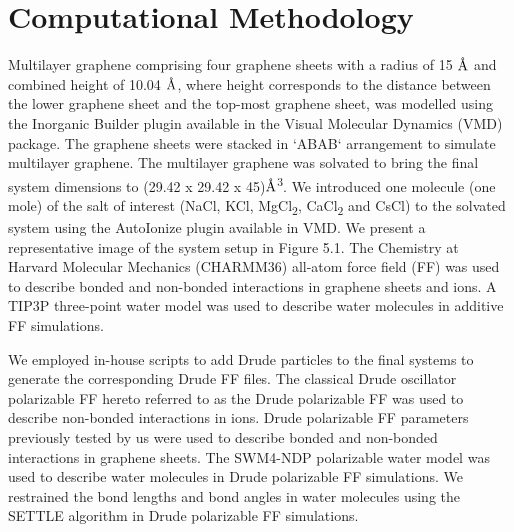 \section{Computational Methodology}
Multilayer graphene comprising four graphene sheets with a radius of 15 $\text{\normalfont\AA}$ and combined height of 10.04 $\text{\normalfont\AA}$, where height corresponds to the distance between the lower graphene sheet and the top-most graphene sheet, was modelled using the Inorganic Builder plugin available in the Visual Molecular Dynamics (VMD) package.\supercite{humphrey_vmd_1996} The graphene sheets were stacked in `ABAB` arrangement to simulate multilayer graphene. The multilayer graphene was solvated to bring the final system dimensions to (29.42 x 29.42 x 45)$\text{\normalfont\AA}$\textsuperscript{3}. We introduced one molecule (one mole) of the salt of interest (NaCl, KCl, MgCl\textsubscript{2}, CaCl\textsubscript{2} and CsCl) to the solvated system using the AutoIonize plugin available in VMD. We present a representative image of the system setup in Figure 5.1. The Chemistry at Harvard Molecular Mechanics (CHARMM36) all-atom force field (FF) was used to describe bonded and non-bonded interactions in graphene sheets and ions.\supercite{vanommeslaeghe_charmm_2009} A TIP3P three-point water model\supercite{jorgensen_comparison_1983} was used to describe water molecules in additive FF simulations.

We employed in-house scripts to add Drude particles to the final systems to generate the corresponding Drude FF files. The classical Drude oscillator polarizable FF hereto referred to as the Drude polarizable FF was used to describe non-bonded interactions in ions.\supercite{lin_polarizable_2018,h_polarization_2021} Drude polarizable FF parameters previously tested by us were used to describe bonded and non-bonded interactions in graphene sheets.\supercite{h_polarization_2021} The SWM4-NDP polarizable water model\supercite{lamoureux_polarizable_2006} was used to describe water molecules in Drude polarizable FF simulations. We restrained the bond lengths and bond angles in water molecules using the SETTLE algorithm\supercite{miyamoto_settle_1992} in Drude polarizable FF simulations.

